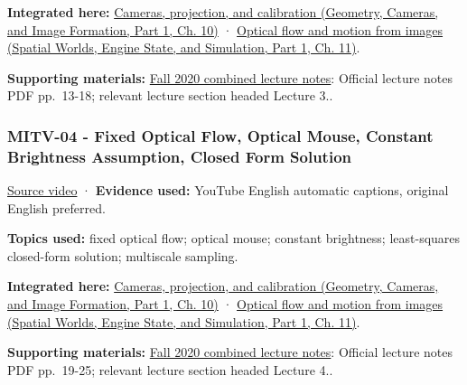 \textbf{Integrated here:} \href{../03-Geometry-Cameras-and-Image-Formation-P01/main.pdf\#03-visual-computing-i-ch003-cameras-projection-and-calibration}{Cameras, projection, and calibration (Geometry, Cameras, and Image Formation, Part 1, Ch. 10)} · \href{../05-Spatial-Worlds-Engine-State-and-Simulation-P01/main.pdf\#04-visual-computing-ii-ch030-optical-flow-and-motion-from-images}{Optical flow and motion from images (Spatial Worlds, Engine State, and Simulation, Part 1, Ch. 11)}.

\textbf{Supporting materials:} \href{https://ocw.mit.edu/courses/6-801-machine-vision-fall-2020/9ec44f69e72995c370b3797818ba01e6_MIT6_801F20_lectureNotes.pdf}{Fall 2020 combined lecture notes}: Official lecture notes PDF pp.~13-18; relevant lecture section headed Lecture 3..

\subsubsection{MITV-04 - Fixed Optical Flow, Optical Mouse, Constant Brightness Assumption, Closed Form Solution}\label{04-visual-computing-ii-ch036-mitv-04---fixed-optical-flow-optical-mouse-constant-brightness-assumption-closed-form-solution}

\hypertarget{04-visual-computing-ii-ch036-mitv-04---fixed-optical-flow-optical-mouse-constant-brightness-assumption-closed-form-solution}{}

\href{https://www.youtube.com/watch?v=3NarS3QpaU0}{Source video} · \textbf{Evidence used:} YouTube English automatic captions, original English preferred.

\textbf{Topics used:} fixed optical flow; optical mouse; constant brightness; least-squares closed-form solution; multiscale sampling.

\textbf{Integrated here:} \href{../03-Geometry-Cameras-and-Image-Formation-P01/main.pdf\#03-visual-computing-i-ch003-cameras-projection-and-calibration}{Cameras, projection, and calibration (Geometry, Cameras, and Image Formation, Part 1, Ch. 10)} · \href{../05-Spatial-Worlds-Engine-State-and-Simulation-P01/main.pdf\#04-visual-computing-ii-ch030-optical-flow-and-motion-from-images}{Optical flow and motion from images (Spatial Worlds, Engine State, and Simulation, Part 1, Ch. 11)}.

\textbf{Supporting materials:} \href{https://ocw.mit.edu/courses/6-801-machine-vision-fall-2020/9ec44f69e72995c370b3797818ba01e6_MIT6_801F20_lectureNotes.pdf}{Fall 2020 combined lecture notes}: Official lecture notes PDF pp.~19-25; relevant lecture section headed Lecture 4..

